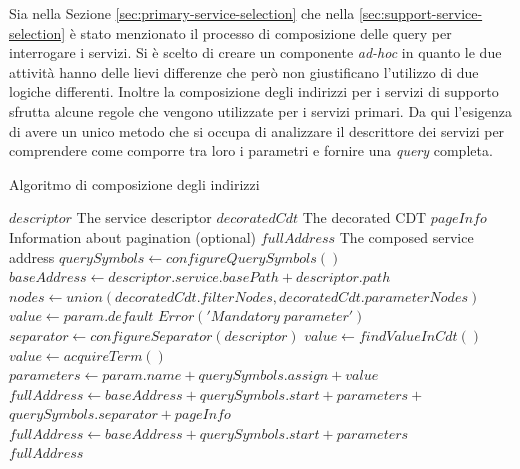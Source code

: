 Sia nella Sezione \ref{sec:primary-service-selection} che nella \ref{sec:support-service-selection} è stato menzionato il processo di composizione delle query per interrogare i servizi. Si è scelto di creare un componente \emph{ad-hoc} in quanto le due attività hanno delle lievi differenze che però non giustificano l'utilizzo di due logiche differenti. Inoltre la composizione degli indirizzi per i servizi di supporto sfrutta alcune regole che vengono utilizzate per i servizi primari. Da qui l'esigenza di avere un unico metodo che si occupa di analizzare il descrittore dei servizi per comprendere come comporre tra loro i parametri e fornire una \emph{query} completa.

\begin{algorithm}
	\caption{Algoritmo di composizione degli indirizzi}
	\label{alg:algoritmo-composizione-indirizzi}
	\begin{algorithmic}
		\Require
			\Statex $ descriptor $ \Comment The service descriptor
			\Statex $ decoratedCdt $ \Comment The decorated CDT
			\Statex $ pageInfo $ \Comment Information about pagination  (optional)
		\Ensure
			\Statex $ fullAddress $ \Comment The composed service address
		\Statex
		\State $ querySymbols \gets configureQuerySymbols() $
		\State $ baseAddress \gets descriptor.service.basePath + descriptor.path $
		\State $ nodes \gets union(decoratedCdt.filterNodes, decoratedCdt.parameterNodes) $
					\State $ value \gets  param.default  $
				\Else
						\State $ Error('Mandatory\; parameter') $
					\EndIf
				\EndIf
			\Else
				\State $ separator \gets configureSeparator(descriptor) $
					\State $ value \gets findValueInCdt() $
				\Else
					\State $ value \gets acquireTerm() $
				\EndIf
			\EndIf
			\State $ parameters \gets param.name + querySymbols.assign + value  $
		\EndFor
			\State $ fullAddress \gets baseAddress + querySymbols.start + parameters +$
			\State\hspace{\algorithmicindent} $ querySymbols.separator + pageInfo $
		\Else
			\State $ fullAddress \gets baseAddress + querySymbols.start + parameters$
		\EndIf\\
		\Return $ fullAddress $
	\end{algorithmic}
\end{algorithm}

